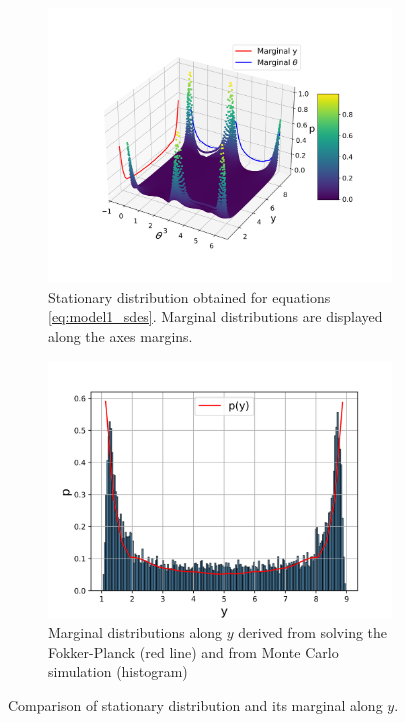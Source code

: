 \begin{figure}[htbp]
    \centering
    \begin{subfigure}[b]{0.45\textwidth}
        \centering
        \includegraphics[width=\textwidth, trim=30 20 30 20, clip]{graphics/model_1_pdf_surface.png}
        \caption{Stationary distribution obtained for equations \eqref{eq:model1_sdes}. Marginal distributions are displayed along 
        the axes margins.}
        \label{fig:subfig_model_1_pdf}
    \end{subfigure}
    \hfill
    \begin{subfigure}[b]{0.45\textwidth}
        \centering
        \includegraphics[width=\textwidth]{graphics/model_1_marginal_y.png}
        \caption{Marginal distributions along $y$ derived from solving the Fokker-Planck (red line) and from
         Monte Carlo simulation (histogram)}
        \label{fig:subfig_model_1_marginal_y}
    \end{subfigure}
    \caption{Comparison of stationary distribution and its marginal along $y$.}
    \label{fig:model_1_results}
\end{figure}

